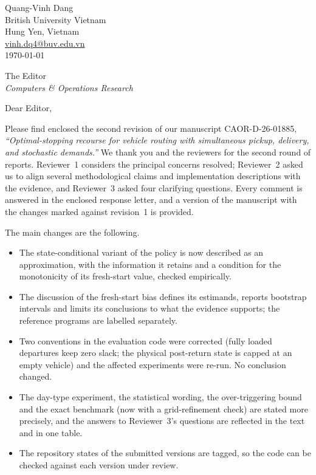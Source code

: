 \documentclass[11pt]{article}
\begin{document}
\begin{flushright}
Quang-Vinh Dang\\
British University Vietnam\\
Hung Yen, Vietnam\\
\href{mailto:vinh.dq4@buv.edu.vn}{vinh.dq4@buv.edu.vn}\\[4pt]
\today
\end{flushright}

\vspace{6pt}
\noindent
The Editor\\
\emph{Computers \& Operations Research}

\vspace{14pt}
\noindent Dear Editor,

Please find enclosed the second revision of our manuscript
CAOR-D-26-01885, \emph{``Optimal-stopping recourse for vehicle routing
with simultaneous pickup, delivery, and stochastic demands.''} We thank
you and the reviewers for the second round of reports. Reviewer~1
considers the principal concerns resolved; Reviewer~2 asked us to align
several methodological claims and implementation descriptions with the
evidence, and Reviewer~3 asked four clarifying questions. Every comment
is answered in the enclosed response letter, and a version of the
manuscript with the changes marked against revision~1 is provided.

The main changes are the following.

\begin{itemize}
\item The state-conditional variant of the policy is now described as an
  approximation, with the information it retains and a condition for the
  monotonicity of its fresh-start value, checked empirically.
\item The discussion of the fresh-start bias defines its estimands,
  reports bootstrap intervals and limits its conclusions to what the
  evidence supports; the reference programs are labelled separately.
\item Two conventions in the evaluation code were corrected (fully loaded
  departures keep zero slack; the physical post-return state is capped at
  an empty vehicle) and the affected experiments were re-run. No
  conclusion changed.
\item The day-type experiment, the statistical wording, the
  over-triggering bound and the exact benchmark (now with a
  grid-refinement check) are stated more precisely, and the answers to
  Reviewer~3's questions are reflected in the text and in one table.
\item The repository states of the submitted versions are tagged, so the
  code can be checked against each version under review.
\end{itemize}
\end{document}
